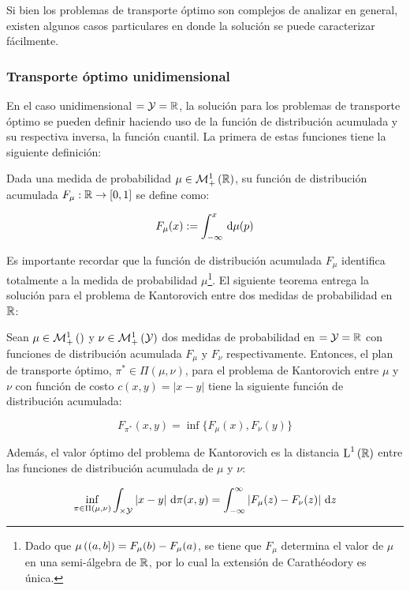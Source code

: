 Si bien los problemas de transporte óptimo son complejos de analizar en general, existen algunos casos particulares en donde la solución se puede caracterizar fácilmente.

\subsubsection{Transporte óptimo unidimensional}

En el caso unidimensional $=\mathcal{Y}=\mathbb{R}$, la solución para los problemas de transporte óptimo se pueden definir haciendo uso de la función de distribución acumulada y su respectiva inversa, la función cuantil. La primera de estas funciones tiene la siguiente definición:

\begin{defn}

	Dada una medida de probabilidad $\mu\in\mathcal{M}_+^1\left(\mathbb{R}\right)$, su función de distribución acumulada $F_\mu:\mathbb{R}\to[0,1]$ se define como:

	\begin{equation*}
		F_\mu(x) := \int_{-\infty}^x \,\operatorname{d}\!\mu(p)
	\end{equation*}

\end{defn}

Es importante recordar que la función de distribución acumulada $F_\mu$ identifica totalmente a la medida de probabilidad $\mu$\footnote{Dado que $\mu\left((a, b]\right) = F_\mu(b) - F_\mu(a)$, se tiene que $F_\mu$ determina el valor de $\mu$ en una semi-álgebra de $\mathbb{R}$, por lo cual la extensión de Carathéodory es única.}. El siguiente teorema entrega la solución para el problema de Kantorovich entre dos medidas de probabilidad en $\mathbb{R}$:

\begin{teo}
	\label{teo:kantorovich_r}
	Sean $\mu\in\mathcal{M}_+^1\left(\right)$ y $\nu\in\mathcal{M}_+^1\left(\mathcal{Y}\right)$ dos medidas de probabilidad en $=\mathcal{Y}=\mathbb{R}$ con funciones de distribución acumulada $F_\mu$ y $F_\nu$ respectivamente. Entonces, el plan de transporte óptimo, $\pi^*\in\Pi(\mu,\nu)$, para el problema de Kantorovich entre $\mu$ y $\nu$ con función de costo $c(x,y)=|x-y|$ tiene la siguiente función de distribución acumulada:

	\begin{equation*}
		F_{\pi^*}(x,y) = \inf \{F_\mu(x),F_\nu(y)\}
	\end{equation*}

	Además, el valor óptimo del problema de Kantorovich es la distancia $\operatorname{L}^{1}\left(\mathbb{R}\right)$ entre las funciones de distribución acumulada de $\mu$ y $\nu$:

	\begin{equation*}
		\inf_{\pi \in \Pi(\mu,\nu)} \int_{\times\mathcal{Y}} |x-y| \,\operatorname{d}\!\pi(x, y) =
		\int_{-\infty}^\infty \left|F_\mu(z)-F_\nu(z)\right| \,\operatorname{d}\! z
	\end{equation*}
\end{teo}

